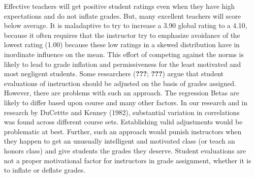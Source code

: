 \documentclass[man]{apa6}
\theoremstyle{definition}
\theoremstyle{definition}
\theoremstyle{definition}
\theoremstyle{remark}
\begin{document}
Effective teachers will get positive student ratings even when they have
high expectations and do not inflate grades. But, many excellent
teachers will score below average. It is maladaptive to try to increase
a 3.90 global rating to a 4.10, because it often requires that the
instructor try to emphasize avoidance of the lowest rating (1.00)
because these low ratings in a skewed distribution have in inordinate
influence on the mean. This effort of competing against the norms is
likely to lead to grade inflation and permissiveness for the least
motivated and most negligent students. Some researchers ({\textbf{???}};
{\textbf{???}}) argue that student evaluations of instruction should be
adjusted on the basis of grades assigned. However, there are problems
with such an approach. The regression Betas are likely to differ based
upon course and many other factors. In our research and in research by
DuCettte and Kenney (1982), substantial variation in correlations was
found across different course sets. Establishing valid adjustments would
be problematic at best. Further, such an approach would punish
instructors when they happen to get an unusually intelligent and
motivated class (or teach an honors class) and give students the grades
they deserve. Student evaluations are not a proper motivational factor
for instructors in grade assignment, whether it is to inflate or deflate
grades.
\end{document}
